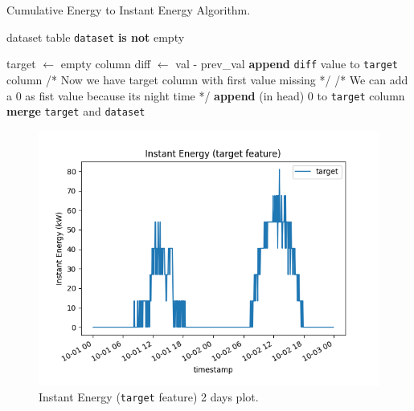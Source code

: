 
\begin{algorithm}[H]
	\caption{Cumulative Energy to Instant Energy Algorithm.}\label{alg:cumtoinstant}
	\begin{algorithmic}
		\Require dataset table
		\Ensure \texttt{dataset} \textbf{is not} empty

		\State target $\gets$ empty column
		\State diff $\gets$ val - prev\_val
		\State \textbf{append} \texttt{diff} value to \texttt{target} column
		\EndFor
		\State /* Now we have target column with first value missing */
		\State /* We can add a 0 as fist value because its night time */
		\State \textbf{append} (in head) 0 to \texttt{target} column
		\State \textbf{merge} \texttt{target} and \texttt{dataset}
	\end{algorithmic}
\end{algorithm}

\begin{figure}[H]
	\centering
	\includegraphics[width=\linewidth, keepaspectratio]{chapters/2_data_preprocessing/imgs/targetfeature.png}
	\caption{Instant Energy (\texttt{target} feature) 2 days plot.}
	\label{fig:targetfeature}
\end{figure}

